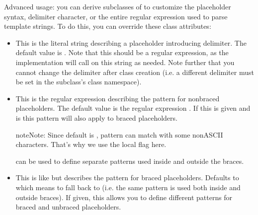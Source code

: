 \documentclass[letterpaper,10pt,english]{sphinxmanual}
\begin{document}
Advanced usage: you can derive subclasses of {\hyperref[\detokenize{string:string.Template}]{}} to customize
the placeholder syntax, delimiter character, or the entire regular expression
used to parse template strings.  To do this, you can override these class
attributes:
\begin{itemize}
\item {}
 \textendash{} This is the literal string describing a placeholder
introducing delimiter.  The default value is \sphinxcode{\sphinxupquote{\$}}.  Note that this should
 be a regular expression, as the implementation will call
 on this string as needed.  Note further that you cannot
change the delimiter after class creation (i.e. a different delimiter must
be set in the subclass’s class namespace).

\item {}
 \textendash{} This is the regular expression describing the pattern for
non\sphinxhyphen{}braced placeholders.  The default value is the regular expression
.  If this is given and  is
 this pattern will also apply to braced placeholders.

\begin{sphinxadmonition}{note}{Note:}
Since default  is , pattern \sphinxcode{\sphinxupquote{{[}a\sphinxhyphen{}z{]}}} can match
with some non\sphinxhyphen{}ASCII characters. That’s why we use the local  flag
here.
\end{sphinxadmonition}

 can be used to define separate patterns used inside and
outside the braces.

\item {}
 \textendash{} This is like  but describes the pattern for
braced placeholders.  Defaults to  which means to fall back to
 (i.e. the same pattern is used both inside and outside braces).
If given, this allows you to define different patterns for braced and
unbraced placeholders.


\end{itemize}
\end{document}
